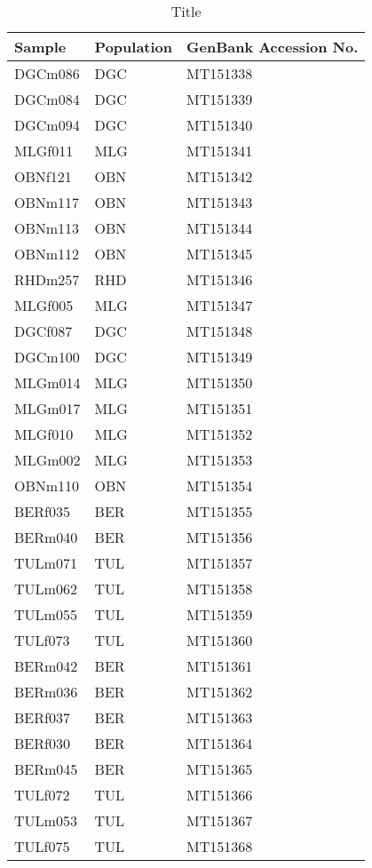 \documentclass[12pt,]{article}
\begin{document}
\begin{longtable}{ll>{\raggedright\arraybackslash}p{3 cm}}
\caption{\label{tab:Table S6}Title}\\
\toprule
\textbf{Sample} & \textbf{Population} & \textbf{GenBank Accession No.}\\
\midrule
DGCm086 & DGC & MT151338\\
DGCm084 & DGC & MT151339\\
DGCm094 & DGC & MT151340\\
MLGf011 & MLG & MT151341\\
OBNf121 & OBN & MT151342\\
\addlinespace
OBNm117 & OBN & MT151343\\
OBNm113 & OBN & MT151344\\
OBNm112 & OBN & MT151345\\
RHDm257 & RHD & MT151346\\
MLGf005 & MLG & MT151347\\
\addlinespace
DGCf087 & DGC & MT151348\\
DGCm100 & DGC & MT151349\\
MLGm014 & MLG & MT151350\\
MLGm017 & MLG & MT151351\\
MLGf010 & MLG & MT151352\\
\addlinespace
MLGm002 & MLG & MT151353\\
OBNm110 & OBN & MT151354\\
BERf035 & BER & MT151355\\
BERm040 & BER & MT151356\\
TULm071 & TUL & MT151357\\
\addlinespace
TULm062 & TUL & MT151358\\
TULm055 & TUL & MT151359\\
TULf073 & TUL & MT151360\\
BERm042 & BER & MT151361\\
BERm036 & BER & MT151362\\
\addlinespace
BERf037 & BER & MT151363\\
BERf030 & BER & MT151364\\
BERm045 & BER & MT151365\\
TULf072 & TUL & MT151366\\
TULm053 & TUL & MT151367\\
\addlinespace
TULf075 & TUL & MT151368\\
\bottomrule
\end{longtable}

\endgroup{}
\end{document}
